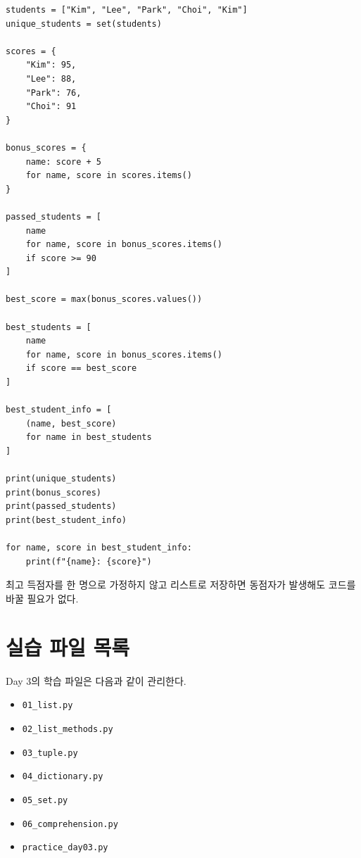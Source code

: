 \documentclass[11pt,a4paper]{article}
\begin{document}
\begin{lstlisting}
students = ["Kim", "Lee", "Park", "Choi", "Kim"]
unique_students = set(students)

scores = {
    "Kim": 95,
    "Lee": 88,
    "Park": 76,
    "Choi": 91
}

bonus_scores = {
    name: score + 5
    for name, score in scores.items()
}

passed_students = [
    name
    for name, score in bonus_scores.items()
    if score >= 90
]

best_score = max(bonus_scores.values())

best_students = [
    name
    for name, score in bonus_scores.items()
    if score == best_score
]

best_student_info = [
    (name, best_score)
    for name in best_students
]

print(unique_students)
print(bonus_scores)
print(passed_students)
print(best_student_info)

for name, score in best_student_info:
    print(f"{name}: {score}")
\end{lstlisting}

\begin{importantbox}
최고 득점자를 한 명으로 가정하지 않고 리스트로 저장하면 동점자가 발생해도 코드를 바꿀 필요가 없다.
\end{importantbox}

\section{실습 파일 목록}

\begin{practicebox}
Day 3의 학습 파일은 다음과 같이 관리한다.
\begin{itemize}[leftmargin=1.5em]
    \item \texttt{01\_list.py}
    \item \texttt{02\_list\_methods.py}
    \item \texttt{03\_tuple.py}
    \item \texttt{04\_dictionary.py}
    \item \texttt{05\_set.py}
    \item \texttt{06\_comprehension.py}
    \item \texttt{practice\_day03.py}
\end{itemize}
\end{practicebox}
\end{document}
